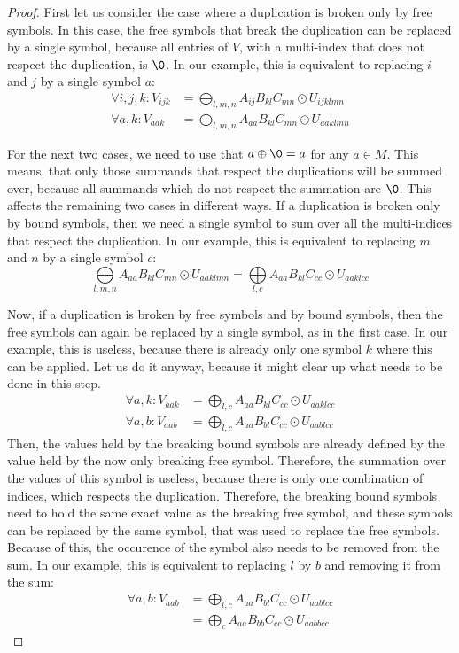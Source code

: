 \begin{proof}
    First let us consider the case where a duplication is broken only by free symbols.
    In this case, the free symbols that break the duplication can be replaced by a single symbol,
    because all entries of $V$, with a multi-index that does not respect the duplication, is $\0$.
    In our example, this is equivalent to replacing $i$ and $j$ by a single symbol $a$:
    \begin{align*}
        \forall i,j,k: V_{ijk} & = \bigoplus\limits_{l,m,n} A_{ij} B_{kl} C_{mn} \odot U_{ijklmn} \\
        \forall a,k: V_{aak}   & = \bigoplus\limits_{l,m,n} A_{aa} B_{kl} C_{mn} \odot U_{aaklmn}
    \end{align*}

    For the next two cases, we need to use that $a \oplus \0 = a$ for any $a \in M$.
    This means, that only those summands that respect the duplications will be summed over,
    because all summands which do not respect the summation are $\0$.
    This affects the remaining two cases in different ways.
    If a duplication is broken only by bound symbols, then we need a single symbol to sum over all the multi-indices that respect the duplication.
    In our example, this is equivalent to replacing $m$ and $n$ by a single symbol $c$:
    $$\bigoplus\limits_{l,m,n} A_{aa} B_{kl} C_{mn} \odot U_{aaklmn} = \bigoplus\limits_{l,c} A_{aa} B_{kl} C_{cc} \odot U_{aaklcc}$$

    Now, if a duplication is broken by free symbols and by bound symbols,
    then the free symbols can again be replaced by a single symbol, as in the first case.
    In our example, this is useless, because there is already only one symbol $k$ where this can be applied.
    Let us do it anyway, because it might clear up what needs to be done in this step.
    \begin{align*}
        \forall a,k: V_{aak} & = \bigoplus\limits_{l,c} A_{aa} B_{kl} C_{cc} \odot U_{aaklcc} \\
        \forall a,b: V_{aab} & = \bigoplus\limits_{l,c} A_{aa} B_{bl} C_{cc} \odot U_{aablcc}
    \end{align*}
    Then, the values held by the breaking bound symbols are already defined by the value held by the now only breaking free symbol.
    Therefore, the summation over the values of this symbol is useless, because there is only one combination of indices, which respects the duplication.
    Therefore, the breaking bound symbols need to hold the same exact value as the breaking free symbol,
    and these symbols can be replaced by the same symbol, that was used to replace the free symbols.
    Because of this, the occurence of the symbol also needs to be removed from the sum.
    In our example, this is equivalent to replacing $l$ by $b$ and removing it from the sum:
    \begin{align*}
        \forall a,b: V_{aab} & = \bigoplus\limits_{l,c} A_{aa} B_{bl} C_{cc} \odot U_{aablcc} \\
                             & = \bigoplus\limits_{c} A_{aa} B_{bb} C_{cc} \odot U_{aabbcc}
    \end{align*}


\end{proof}
